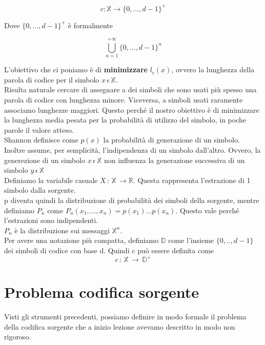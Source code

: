 \documentclass{article}
\begin{document}
    $$c : \mathbb{X} \rightarrow \{0,...,d-1\}^+$$

    Dove $\{0,...,d-1\}^+$ è formalmente

    $$\bigcup_{n=1}^{+\infty}\{0,...,d-1\}^n$$

    \noindent L'obiettivo che ci poniamo è di \textbf{minimizzare} $l_c(x)$, ovvero la lunghezza della parola di codice per il simbolo $x\,\epsilon \, \mathbb{X}$. \\

    \noindent Risulta naturale cercare di assegnare a dei simboli che sono usati più spesso una parola di codice con lunghezza minore. Viceversa, a simboli usati raramente associamo lunghezze maggiori. Questo perché il nostro obiettivo è di minimizzare la lunghezza media pesata per la probabilità di utilizzo del simbolo, in poche parole il valore atteso. \\

    \noindent Shannon definisce come $p(x)$ la probabilità di generazione di un simbolo. Inoltre assume, per semplicità, l'indipendenza di un simbolo dall'altro. Ovvero, la generezione di un simbolo $x \, \epsilon \, \mathbb{X}$ non influenza la generazione successiva di un simbolo $y \, \epsilon \, \mathbb{X}$
    \\

    \noindent Definiamo la variabile casuale  $X\,:\, \mathbb{X} \, \rightarrow \mathbb{R}$. Questa rappresenta l'estrazione di 1 simbolo dalla sorgente. \\
    p diventa quindi la distribuzione di probabilità dei simboli della sorgente, mentre definiamo $P_n$ come  $P_n(x_1,...,x_n) = p(x_1)...p(x_n)$. Questo vale perché l'estrazioni sono indipendenti. \\
    $P_n$ è la distribuzione sui messaggi $\mathbb{X}^n$. \\

    \noindent Per avere una notazione più compatta, definiamo $\mathbb{D}$ come l'insieme $\{0,..,d-1\}$ dei simboli di codice con base d. Quindi c può essere definita come  $$c\,:\, \mathbb{X} \, \rightarrow \, \mathbb{D}^+$$

    \section{Problema codifica sorgente}

    Visti gli strumenti precedenti, possiamo definire in modo formale il problema della codifica sorgente che a inizio lezione avevamo descritto in modo non rigoroso.
\end{document}
